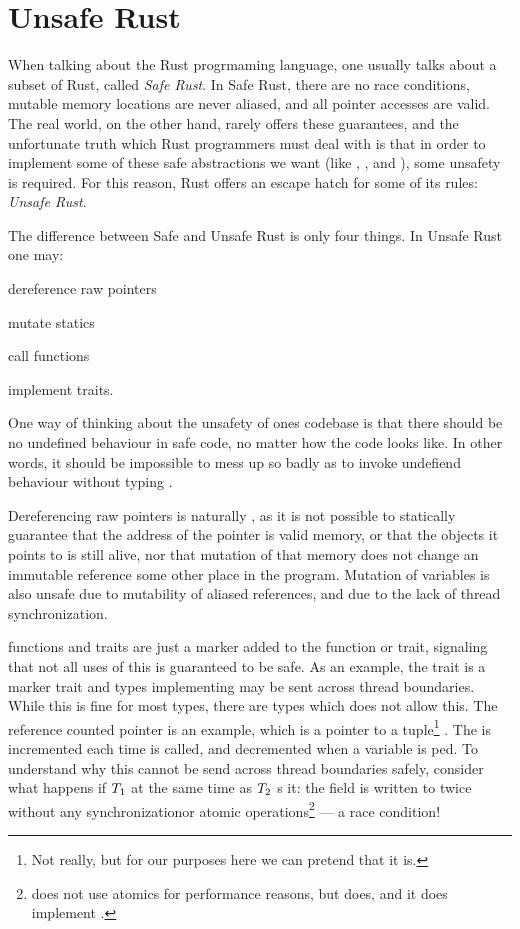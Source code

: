 \section{Unsafe Rust\label{sec:unsafe-rust}}

When talking about the Rust progrmaming language, one usually talks about a subset of Rust, called
\emph{Safe Rust}. In Safe Rust, there are no race conditions, mutable memory locations are never
aliased, and all pointer accesses are valid.  The real world, on the other hand, rarely offers
these guarantees, and the unfortunate truth which Rust programmers must deal with is that in order
to implement some of these safe abstractions we want (like , , and
), some unsafety is required.  For this reason, Rust offers an escape hatch for some of
its rules: \emph{Unsafe Rust}.

The difference between Safe and Unsafe Rust is only four things. In Unsafe Rust one may:
\begin{enumerate*}[1) ]
    \item dereference raw pointers
    \item mutate statics
    \item call  functions
    \item implement  traits.
\end{enumerate*}
One way of thinking about the unsafety of ones codebase is that there should be no undefined
behaviour in safe code, no matter how the code looks like. In other words, it should be impossible
to mess up so badly as to invoke undefiend behaviour without typing .

Dereferencing raw pointers is naturally , as it is not possible to statically
guarantee that the address of the pointer is valid memory, or that the objects it points to is
still alive, nor that mutation of that memory does not change an immutable reference some other
place in the program. Mutation of  variables is also unsafe due to mutability of
aliased references, and due to the lack of thread synchronization.

 functions and traits are just a marker added to the function or trait, signaling that
not all uses of this is guaranteed to be safe. As an example, the trait  is a marker
trait and types implementing  may be sent across thread boundaries. While this is fine
for most types, there are types which does not allow this. The reference counted pointer
 is an example, which is a pointer to a tuple\footnote{Not really, but for our purposes
here we can pretend that it is.} . The  is incremented each time
 is called, and decremented when a variable is ped.  To understand why
this cannot be send across thread boundaries safely, consider what happens if $T\sb{1}$
 at the same time as $T\sb{2}$ s it: the  field is written to
twice without any synchronizationor atomic operations\footnote{ does not use atomics for
performance reasons, but  does, and it does implement .} --- a race condition!



